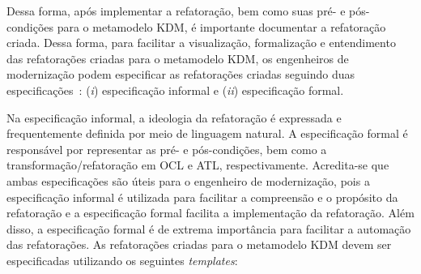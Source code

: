 Dessa forma, após implementar a refatoração, bem como suas pré- e pós-condições para o metamodelo KDM, é importante documentar a refatoração criada. Dessa forma, para facilitar a visualização, formalização e entendimento das refatorações criadas para o metamodelo KDM, os engenheiros de modernização podem especificar as refatorações criadas seguindo duas especificações~\cite{staron2004implementing}: (\textit{i}) especificação informal e (\textit{ii}) especificação formal. 

Na especificação informal, a ideologia da refatoração é expressada e frequentemente definida por meio de linguagem natural. A especificação formal é responsável por representar as pré- e pós-condições, bem como a transformação/refatoração em OCL e ATL, respectivamente. Acredita-se que ambas especificações são úteis para o engenheiro de modernização, pois a especificação informal é utilizada para facilitar a compreensão e o propósito da refatoração e a especificação formal facilita a implementação da refatoração. Além disso, a especificação formal é de extrema importância para facilitar a automação das refatorações. 
%
%
%
%
As refatorações criadas para o metamodelo KDM devem ser especificadas utilizando os seguintes \textit{templates}:

